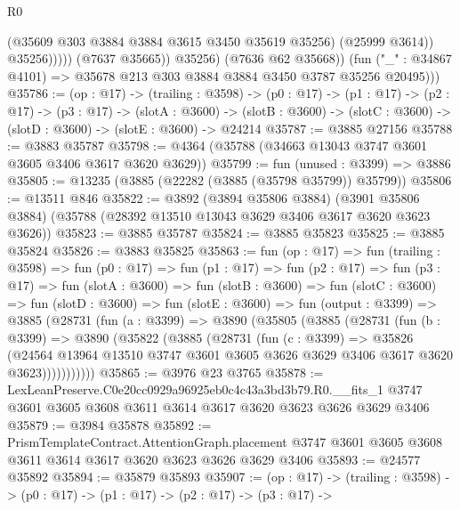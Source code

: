 \begin{lexlean}{R0}
\begin{coremodule}
                          (@35609 @303 @3884 @3884 @3615 @3450 @35619 @35256)
                          (@25999 @3614))
                        @35256)))))
              (@7637 @35665))
            @35256)
          (@7636 @62 @35668))
        (fun ("_" : @34867 @4101) => @35678 @213 @303 @3884 @3884 @3450 @3787 @35256 @20495)))
@35786 := (op : @17) ->
  (trailing : @3598) ->
  (p0 : @17) ->
  (p1 : @17) ->
  (p2 : @17) ->
  (p3 : @17) ->
  (slotA : @3600) ->
  (slotB : @3600) -> (slotC : @3600) -> (slotD : @3600) -> (slotE : @3600) -> @24214
@35787 := @3885 @27156
@35788 := @3883 @35787
@35798 := @4364 (@35788 (@34663 @13043 @3747 @3601 @3605 @3406 @3617 @3620 @3629))
@35799 := fun (unused : @3399) => @3886
@35805 := @13235 (@3885 (@22282 (@3885 (@35798 @35799)) @35799))
@35806 := @13511 @846
@35822 := @3892
    (@3894 @35806 @3884)
    (@3901 @35806 @3884)
    (@35788 (@28392 @13510 @13043 @3629 @3406 @3617 @3620 @3623 @3626))
@35823 := @3885 @35787
@35824 := @3885 @35823
@35825 := @3885 @35824
@35826 := @3883 @35825
@35863 := fun (op : @17) =>
  fun (trailing : @3598) =>
  fun (p0 : @17) =>
  fun (p1 : @17) =>
  fun (p2 : @17) =>
  fun (p3 : @17) =>
  fun (slotA : @3600) =>
  fun (slotB : @3600) =>
  fun (slotC : @3600) =>
  fun (slotD : @3600) =>
  fun (slotE : @3600) =>
  fun (output : @3399) =>
  @3885
    (@28731
      (fun (a : @3399) =>
      @3890
        (@35805
          (@3885
            (@28731
              (fun (b : @3399) =>
              @3890
                (@35822
                  (@3885
                    (@28731
                      (fun (c : @3399) =>
                      @35826
                        (@24564
                          @13964
                          @13510
                          @3747
                          @3601
                          @3605
                          @3626
                          @3629
                          @3406
                          @3617
                          @3620
                          @3623)))))))))))
@35865 := @3976 @23 @3765
@35878 := LexLeanPreserve.C0e20cc0929a96925eb0c4c43a3bd3b79.R0.__fits_1
    @3747
    @3601
    @3605
    @3608
    @3611
    @3614
    @3617
    @3620
    @3623
    @3626
    @3629
    @3406
@35879 := @3984 @35878
@35892 := PrismTemplateContract.AttentionGraph.placement
    @3747
    @3601
    @3605
    @3608
    @3611
    @3614
    @3617
    @3620
    @3623
    @3626
    @3629
    @3406
@35893 := @24577 @35892
@35894 := @35879 @35893
@35907 := (op : @17) ->
  (trailing : @3598) ->
  (p0 : @17) ->
  (p1 : @17) ->
  (p2 : @17) ->
  (p3 : @17) ->

\end{coremodule}
\end{lexlean}
